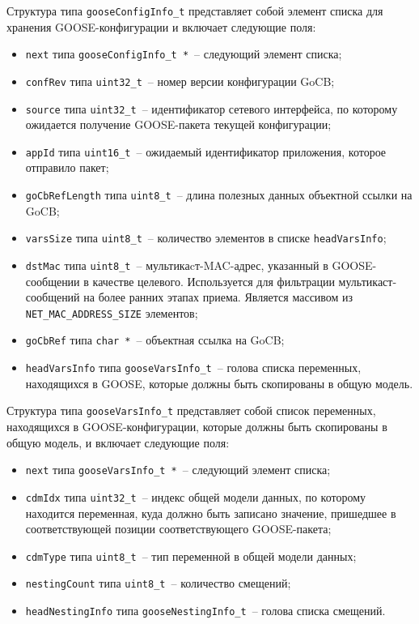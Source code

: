 Структура типа \lstinline{gooseConfigInfo_t} представляет собой элемент списка для хранения GOOSE-конфигурации и включает следующие поля:

\begin{itemize}
    \item \lstinline{next} типа \lstinline{gooseConfigInfo_t *}~-- следующий элемент списка;
    \item \lstinline{confRev} типа \lstinline{uint32_t}~-- номер версии конфигурации GoCB;
    \item \lstinline{source} типа \lstinline{uint32_t}~-- идентификатор сетевого интерфейса, по которому ожидается получение GOOSE-пакета текущей конфигурации;
    \item \lstinline{appId} типа \lstinline{uint16_t}~-- ожидаемый идентификатор приложения, которое отправило пакет;
    \item \lstinline{goCbRefLength} типа \lstinline{uint8_t}~-- длина полезных данных объектной ссылки на GoCB;
    \item \lstinline{varsSize} типа \lstinline{uint8_t}~-- количество элементов в списке \lstinline{headVarsInfo};
    \item \lstinline{dstMac} типа \lstinline{uint8_t}~-- мультикаcт-MAC-адрес, указанный в GOOSE-сообщении в качестве целевого. Используется для фильтрации мультикаст-сообщений на более ранних этапах приема. Является массивом из \lstinline{NET_MAC_ADDRESS_SIZE} элементов;
    \item \lstinline{goCbRef} типа \lstinline{char *}~-- объектная ссылка на GoCB;
    \item \lstinline{headVarsInfo} типа \lstinline{gooseVarsInfo_t}~-- голова списка переменных, находящихся в GOOSE, которые должны быть скопированы в общую модель.
\end{itemize}

Структура типа \lstinline{gooseVarsInfo_t} представляет собой список переменных, находящихся в GOOSE-конфигурации, которые должны быть скопированы в общую модель,
и включает следующие поля:

\begin{itemize}
    \item \lstinline{next} типа \lstinline{gooseVarsInfo_t *}~-- следующий элемент списка;
    \item \lstinline{cdmIdx} типа \lstinline{uint32_t}~--  индекс общей модели данных, по которому находится переменная, куда должно быть
    записано значение, пришедшее в соответствующей позиции соответствующего GOOSE-пакета;
    \item \lstinline{cdmType} типа \lstinline{uint8_t}~-- тип переменной в общей модели данных;
    \item \lstinline{nestingCount} типа \lstinline{uint8_t}~-- количество смещений;
    \item \lstinline{headNestingInfo} типа \lstinline{gooseNestingInfo_t}~-- голова списка смещений.
\end{itemize}

